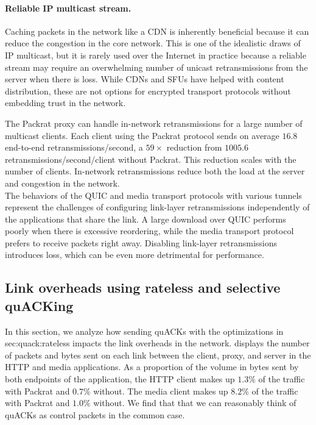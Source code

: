 \paragraph{Reliable IP multicast stream.}

Caching packets in the network like a CDN is inherently beneficial because it
can reduce the congestion in the core network. This is one of the idealistic
draws of IP multicast, but it is rarely used over the Internet in practice
because a reliable stream may require an overwhelming number of unicast
retransmissions from the server when there is loss. While CDNs and SFUs have
helped with content distribution, these are not options for encrypted transport
protocols without embedding trust in the network.

The Packrat proxy can handle in-network retransmissions for a large number of
multicast clients. Each client using the Packrat protocol sends on average $16.8$
end-to-end retransmissions/second, a $59\!\times$ reduction from $1005.6$
retransmissions/second/client without Packrat. This reduction scales with the
number of clients. In-network retransmissions reduce both the load at the
server and congestion in the network.\\

\noindent
The behaviors of the QUIC and media transport protocols with various tunnels
represent the challenges of configuring link-layer retransmissions
independently of the applications that share the link. A large download
over QUIC performs poorly
when there is excessive reordering, while the media transport protocol prefers
to receive packets right away.
Disabling link-layer retransmissions introduces loss, which can be even more
detrimental for performance.

\subsection{Link overheads using rateless and selective quACKing}
\label{sec:packrat:evaluation:link-overheads}



In this section, we analyze how sending quACKs with the optimizations in \Cref
{sec:quack:rateless} impacts the link overheads in the network.
 displays the number of packets and bytes sent on each
link between the client, proxy, and server in the HTTP and media applications.
As a proportion of the volume in bytes sent by both endpoints of the
application, the HTTP client makes up $1.3\%$ of the traffic with Packrat and
$0.7\%$ without. The media client makes up $8.2\%$ of the traffic with Packrat
and $1.0\%$ without. We find that that we can reasonably think of quACKs as
control packets in the common case.

